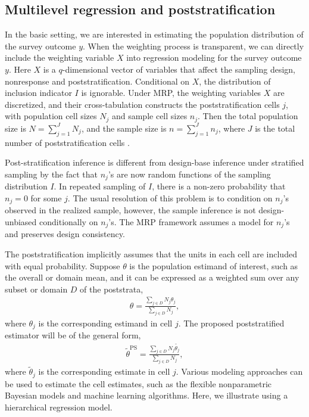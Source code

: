\documentclass[11pt]{article}
\begin{document}
\subsection{Multilevel regression and poststratification}
In the basic setting, we are interested in estimating the population distribution of the survey outcome $y$. When the weighting process is transparent, we can directly include the weighting variable $X$ into regression modeling for the survey outcome $y$. Here $X$ is a $q$-dimensional vector of variables that affect the sampling design, nonresponse and poststratification. Conditional on $X$, the distribution of inclusion indicator $I$ is ignorable. Under MRP, the weighting variables $X$ are discretized, and their cross-tabulation constructs the poststratification cells $j$, with population cell sizes $N_j$ and sample cell sizes $n_j$. Then the total population size is $N=\sum_{j=1}^J N_j$, and the sample size is $n=\sum_{j=1}^Jn_j$, where $J$ is the total number of poststratification cells \citep{little91, little93, gelman:little-97,gelmancarlin01}. 

Post-stratification inference is different from design-base inference under stratified sampling by the fact that $n_j$'s are now random functions of the sampling distribution $I$. In repeated sampling of $I$, there is a non-zero probability that $n_j=0$ for some $j$. The usual resolution of this problem is to condition on $n_j$'s observed in the realized sample, however, the sample inference is not design-unbiased conditionally on $n_j$'s. The MRP framework assumes a model for $n_j$'s and preserves design consistency.
	
The poststratification implicitly assumes that the units in each cell are included with equal probability. Suppose $\theta$ is the population estimand of interest, such as the overall or domain mean, and it can be expressed as a weighted sum over any subset or domain $D$ of the poststrata,
\begin{align}
	\theta=\frac{\sum_{j\in D}N_j\theta_j}{\sum_{j\in D}N_j},
\end{align}
where $\theta_j$ is the corresponding estimand in cell $j$. 
The proposed poststratified estimator will be of the general form,
\begin{align}
\label{model-based}
	\tilde{\theta}^{\textrm{PS}}=\frac{\sum_{j\in D}N_j\tilde{\theta_j}}{\sum_{j\in D}N_j},
\end{align}
where $\tilde{\theta}_j$ is the corresponding estimate in cell $j$. Various modeling approaches can be used to estimate the cell estimates, such as the flexible nonparametric Bayesian models and machine learning algorithms. Here, we illustrate using a hierarchical regression model.
\end{document}
